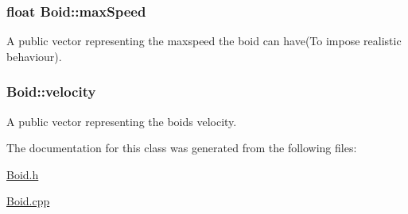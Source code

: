 \subsubsection[{\texorpdfstring{max\+Speed}{maxSpeed}}]{\setlength{\rightskip}{0pt plus 5cm}float Boid\+::max\+Speed}\hypertarget{classBoid_ac57e1058fb698a542990405ecfd1d88b}{}\label{classBoid_ac57e1058fb698a542990405ecfd1d88b}
A public vector representing the maxspeed the boid can have(\+To impose realistic behaviour). 
\subsubsection[{\texorpdfstring{velocity}{velocity}}]{ Boid\+::velocity}\hypertarget{classBoid_a485c85be8c3f465a2a0f07de3e0449e0}{}\label{classBoid_a485c85be8c3f465a2a0f07de3e0449e0}
A public vector representing the boid\textquotesingle{}s velocity. 

The documentation for this class was generated from the following files\+:\begin{DoxyCompactItemize}
\item 
\hyperlink{Boid_8h}{Boid.\+h}\item 
\hyperlink{Boid_8cpp}{Boid.\+cpp}\end{DoxyCompactItemize}
